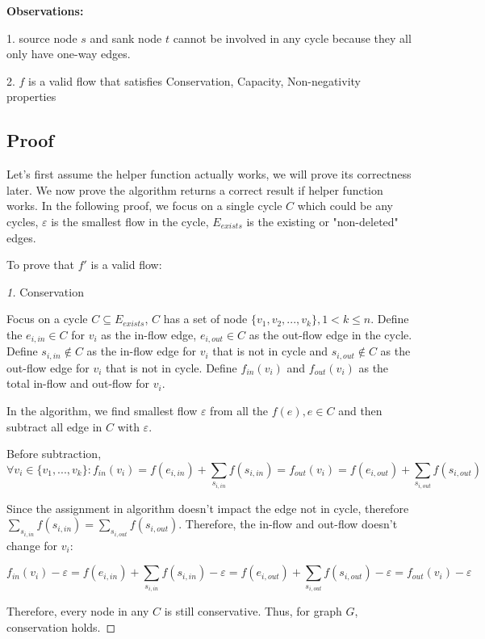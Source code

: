 \documentclass[openany]{article}
\begin{document}
\textbf{Observations:}

1. source node $s$ and sank node $t$ cannot be involved in any cycle because they all only have one-way edges.

2. $f$ is a valid flow that satisfies Conservation, Capacity, Non-negativity properties

\subsection*{Proof}
Let's first assume the helper function actually works, we will prove its correctness later. We now prove the algorithm returns a correct result if helper function works. In the following proof, we focus on a single cycle $C$ which could be any cycles, $\varepsilon$ is the smallest flow in the cycle, $E_{exists}$ is the existing or "non-deleted" edges.

To prove that $f'$ is a valid flow:

\begin{proof}[1]{Conservation}

Focus on a cycle $C \subseteq E_{exists}$, $C$ has a set of node $\{v_1, v_2, ..., v_k\}, 1 < k \leq n$. Define the $e_{i,in} \in C$ for $v_i$ as the in-flow edge, $e_{i,out} \in C$ as the out-flow edge in the cycle. Define $s_{i,in} \notin C$ as the in-flow edge for $v_i$ that is not in cycle and $s_{i,out} \notin C$ as the out-flow edge for $v_i$ that is not in cycle. Define $f_{in}(v_i)$ and $f_{out}(v_i)$ as the total in-flow and out-flow for $v_i$.

In the algorithm, we find smallest flow $\varepsilon$ from all the $f(e), e\in C$ and then subtract all edge in $C$ with $\varepsilon$.

Before subtraction, \[\forall v_i \in \{v_1, ..., v_k\}: f_{in}(v_i) = f(e_{i,in}) + \sum_{s_{i,in}} f(s_{i,in}) = f_{out}(v_i) = f(e_{i,out})+\sum_{s_{i,out}} f(s_{i,out}) \]

Since the assignment in algorithm doesn't impact the edge not in cycle, therefore $\sum_{s_{i,in}} f(s_{i,in}) = \sum_{s_{i,out}} f(s_{i,out})$. Therefore, the in-flow and out-flow doesn't change for $v_i$:

\[f_{in}(v_i) - \varepsilon = f(e_{i,in}) + \sum_{s_{i,in}} f(s_{i,in}) - \varepsilon = f(e_{i,out}) +\sum_{s_{i,out}} f(s_{i,out}) - \varepsilon = f_{out}(v_i) - \varepsilon\]

Therefore, every node in any $C$ is still conservative. Thus, for graph $G$, conservation holds.


\end{proof}
\end{document}
